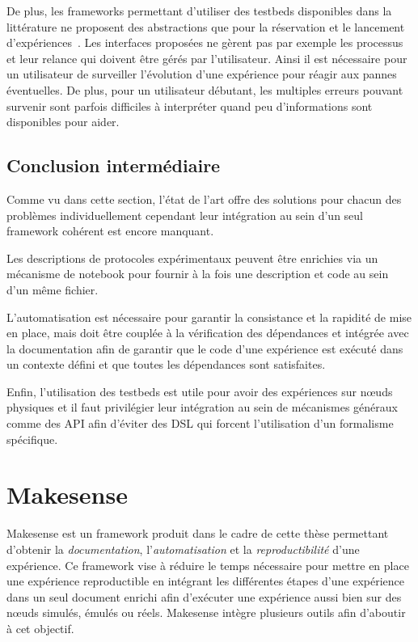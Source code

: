 De plus, les frameworks permettant d'utiliser des testbeds disponibles dans la littérature ne proposent des abstractions que pour la réservation et le lancement d'expériences~\cite{auge2014tools,baron2012towards}.
Les interfaces proposées ne gèrent pas par exemple les processus et leur relance qui doivent être gérés par l'utilisateur.
Ainsi il est nécessaire pour un utilisateur de surveiller l'évolution d'une expérience pour réagir aux pannes éventuelles.
De plus, pour un utilisateur débutant, les multiples erreurs pouvant survenir sont parfois difficiles à interpréter quand peu d'informations sont disponibles pour aider.

\subsection*{Conclusion intermédiaire}

Comme vu dans cette section, l'état de l'art offre des solutions pour chacun des problèmes individuellement cependant leur intégration au sein d'un seul framework cohérent est encore manquant.

Les descriptions de protocoles expérimentaux peuvent être enrichies via un mécanisme de notebook pour fournir à la fois une description et code au sein d'un même fichier.

L'automatisation est nécessaire pour garantir la consistance et la rapidité de mise en place, mais doit être couplée à la vérification des dépendances et intégrée avec la documentation afin de garantir que le code d'une expérience est exécuté dans un contexte défini et que toutes les dépendances sont satisfaites.

Enfin, l'utilisation des testbeds est utile pour avoir des expériences sur nœuds physiques et il faut privilégier leur intégration au sein de mécanismes généraux comme des \ac{API} afin d'éviter des \ac{DSL} qui forcent l'utilisation d'un formalisme spécifique.

\section{Makesense}
\label{makesense:makesense}

Makesense est un framework produit dans le cadre de cette thèse permettant d'obtenir la \emph{documentation}, l'\emph{automatisation} et la \emph{reproductibilité} d'une expérience.
Ce framework vise à réduire le temps nécessaire pour mettre en place une expérience reproductible en intégrant les différentes étapes d'une expérience dans un seul document enrichi afin d'exécuter une expérience aussi bien sur des nœuds simulés, émulés ou réels.
Makesense intègre plusieurs outils afin d'aboutir à cet objectif.

